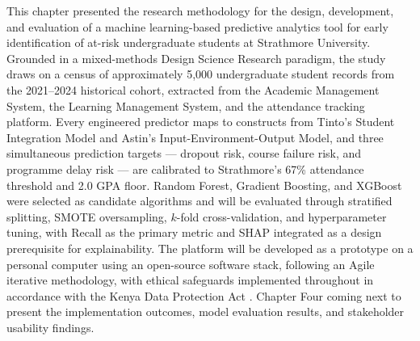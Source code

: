 \documentclass[12pt]{report}
\begin{document}
This chapter presented the research methodology for the design, development,
and evaluation of a machine learning-based predictive analytics tool for
early identification of at-risk undergraduate students at Strathmore
University. Grounded in a mixed-methods Design Science Research paradigm,
the study draws on a census of approximately 5,000 undergraduate student
records from the 2021--2024 historical cohort, extracted from the Academic
Management System, the Learning Management System, and the attendance
tracking platform. Every engineered predictor maps to constructs from
Tinto's Student Integration Model and Astin's Input-Environment-Output
Model, and three simultaneous prediction targets --- dropout risk, course
failure risk, and programme delay risk --- are calibrated to Strathmore's
67\% attendance threshold and 2.0 GPA floor. Random Forest, Gradient
Boosting, and XGBoost were selected as candidate algorithms and will be
evaluated through stratified splitting, SMOTE oversampling, $k$-fold
cross-validation, and hyperparameter tuning, with Recall as the primary
metric and SHAP integrated as a design prerequisite for explainability.
The platform will be developed as a prototype on a personal computer using
an open-source software stack, following an Agile iterative methodology,
with ethical safeguards implemented throughout in accordance with the
Kenya Data Protection Act \parencite{kenya2019dataprotection}. Chapter
Four coming next to present the implementation outcomes, model evaluation results, and
stakeholder usability findings.

\printbibliography[title={REFERENCES}]
\end{document}
